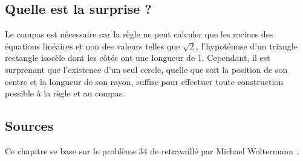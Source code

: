 


\subsection*{Quelle est la surprise ?}

Le compas est nécessaire car la règle ne peut calculer que les racines des équations linéaires et non des valeurs telles que $\sqrt{2}$, l'hypoténuse d'un triangle rectangle isocèle dont les côtés ont une longueur de $1$. Cependant, il est surprenant que l'existence d'un seul cercle, quelle que soit la position de son centre et la longueur de son rayon, suffise pour effectuer toute construction possible à la  règle et au compas.



\subsection*{Sources}

Ce chapitre se base sur le problème $34$ de \cite{dorrie1} retravaillé par Michael Woltermann \cite{dorrie2}.
